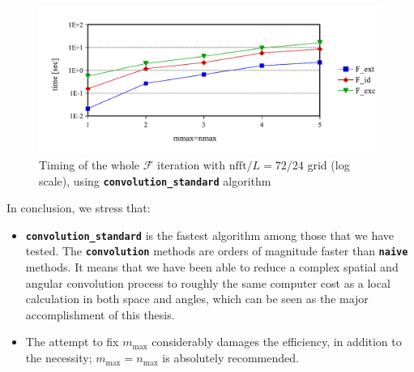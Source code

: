 \begin{figure}[H]
\begin{centering}
\includegraphics[bb=0bp 20bp 504bp 196bp,scale=0.7]{_figure/results/global_perf}
\par\end{centering}
\caption[Timing of the whole $\mathcal{F}$ iteration]{Timing of the whole $\mathcal{F}$ iteration with $\mathrm{nfft}/L=72/24$
grid (log scale), using \texttt{\textbf{convolution\_standard}} algorithm
\label{fig:Timing-full}}
\end{figure}

In conclusion, we stress that:
\begin{itemize}
\item \texttt{\textbf{convolution\_standard}} is the fastest algorithm among
those that we have tested. The \texttt{\textbf{convolution}} methods
are orders of magnitude faster than \texttt{\textbf{naive}} methods.
It means that we have been able to reduce a complex spatial and angular
convolution process to roughly the same computer cost as a local calculation
in both space and angles, which can be seen as the major accomplishment
of this thesis.
\item The attempt to fix $m_{\max}$ considerably damages the efficiency,
in addition to the necessity; $m_{\max}=n_{\max}$ is absolutely recommended.
\end{itemize}

